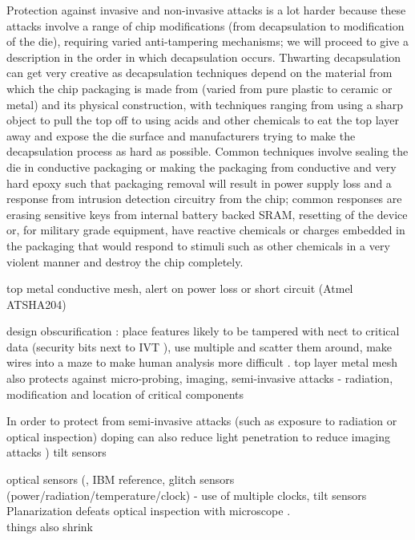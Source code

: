 Protection against invasive and non-invasive attacks is a lot harder because these attacks involve a range of chip modifications (from decapsulation to modification of the die), requiring varied anti-tampering mechanisms; we will proceed to give a description in the order in which decapsulation occurs. Thwarting decapsulation can get very creative as decapsulation techniques depend on the material from which the chip packaging is made from (varied from pure plastic to ceramic or metal) and its physical construction, with techniques ranging from using a sharp object to pull the top off \citep{sergei:thesis} to using acids and other chemicals \citep{hwre}\citep{sergei:thesis} to eat the top layer away and expose the die surface and manufacturers trying to make the decapsulation process as hard as possible. Common techniques involve sealing the die in conductive packaging or making the packaging from conductive and very hard epoxy such that packaging removal will result in power supply loss and a response from intrusion detection circuitry from the chip; common responses are erasing sensitive keys from internal battery backed SRAM\citep{hwre}, resetting of the device \citep{sergei:thesis} or, for military grade equipment, have reactive chemicals or charges embedded in the packaging that would respond to stimuli such as other chemicals in a very violent manner and destroy the chip completely. 

top metal conductive mesh, alert on power loss or short circuit (Atmel ATSHA204) 

design obscurification : place features likely to be tampered with nect to critical data (security bits next to IVT )\citep{hwre}, use multiple and scatter them around\citep{sergei:thesis}, make wires into a maze to make human analysis more difficult \citep{hwre}. top layer metal mesh also protects against micro-probing, imaging, semi-invasive attacks - radiation, modification and location of critical components\citep{hwre}\citep{sergei:thesis}

In order to protect from semi-invasive attacks (such as exposure to radiation or optical inspection) doping can also reduce light penetration to reduce imaging attacks \citep{sergei:thesis})
tilt sensors \citep{website:ibm_secure}

optical sensors (\citep{sergei:thesis}, IBM reference, \citep{hwre}
glitch sensors (power/radiation/temperature/clock) - use of multiple clocks, 
tilt sensors 
Planarization defeats optical inspection with microscope \citep{sergei:thesis}.\\
things also shrink



